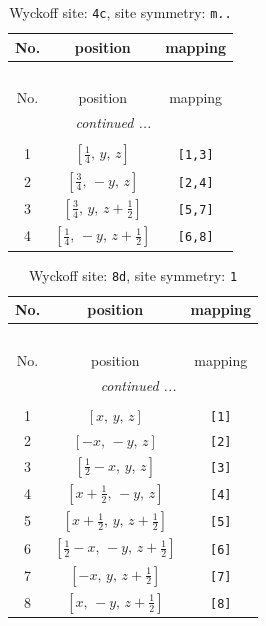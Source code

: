 \documentclass[fleqn,8pt]{jsarticle}
\begin{document}
\renewcommand{\arraystretch}{1.2}
\begin{longtable}{ccc}
\caption{Wyckoff site: {\tt 4c}, site symmetry: {\tt m..}}
 \\
 \hline \hline
No. & position & mapping \\ \hline \endfirsthead

\multicolumn{2}{l}{\tablename\ \thetable{}} \\
 \hline \hline
No. & position & mapping \\ \hline \endhead

 \hline \hline
\multicolumn{2}{r}{\footnotesize\it continued ...} \\ \endfoot

 \hline \hline
\multicolumn{2}{r}{} \\ \endlastfoot

1 & $\left[ \frac{1}{4},\, y,\, z \right]$ & {\tt [1,3]} \\ \hline
2 & $\left[ \frac{3}{4},\, - y,\, z \right]$ & {\tt [2,4]} \\ \hline
3 & $\left[ \frac{3}{4},\, y,\, z + \frac{1}{2} \right]$ & {\tt [5,7]} \\ \hline
4 & $\left[ \frac{1}{4},\, - y,\, z + \frac{1}{2} \right]$ & {\tt [6,8]} \\
\end{longtable}
\renewcommand{\arraystretch}{1.2}
\begin{longtable}{ccc}
\caption{Wyckoff site: {\tt 8d}, site symmetry: {\tt 1}}
 \\
 \hline \hline
No. & position & mapping \\ \hline \endfirsthead

\multicolumn{2}{l}{\tablename\ \thetable{}} \\
 \hline \hline
No. & position & mapping \\ \hline \endhead

 \hline \hline
\multicolumn{2}{r}{\footnotesize\it continued ...} \\ \endfoot

 \hline \hline
\multicolumn{2}{r}{} \\ \endlastfoot

1 & $\left[ x,\, y,\, z \right]$ & {\tt [1]} \\ \hline
2 & $\left[ - x,\, - y,\, z \right]$ & {\tt [2]} \\ \hline
3 & $\left[ \frac{1}{2} - x,\, y,\, z \right]$ & {\tt [3]} \\ \hline
4 & $\left[ x + \frac{1}{2},\, - y,\, z \right]$ & {\tt [4]} \\ \hline
5 & $\left[ x + \frac{1}{2},\, y,\, z + \frac{1}{2} \right]$ & {\tt [5]} \\ \hline
6 & $\left[ \frac{1}{2} - x,\, - y,\, z + \frac{1}{2} \right]$ & {\tt [6]} \\ \hline
7 & $\left[ - x,\, y,\, z + \frac{1}{2} \right]$ & {\tt [7]} \\ \hline
8 & $\left[ x,\, - y,\, z + \frac{1}{2} \right]$ & {\tt [8]} \\
\end{longtable}
\end{document}
